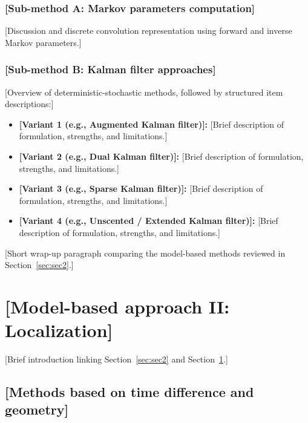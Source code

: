 \documentclass[final,5p,times,twocolumn]{elsarticle}
\begin{document}
\subsubsection{[Sub-method A: Markov parameters computation]}\label{subsubsec:sec2_2_1}

[Discussion and discrete convolution representation using forward and inverse Markov parameters.]

\subsubsection{[Sub-method B: Kalman filter approaches]}\label{subsubsec:sec2_2_2}

[Overview of deterministic-stochastic methods, followed by structured item descriptions:]
\begin{itemize}
    \item \textbf{[Variant 1 (e.g., Augmented Kalman filter)]:} [Brief description of formulation, strengths, and limitations.]
    \item \textbf{[Variant 2 (e.g., Dual Kalman filter)]:} [Brief description of formulation, strengths, and limitations.]
    \item \textbf{[Variant 3 (e.g., Sparse Kalman filter)]:} [Brief description of formulation, strengths, and limitations.]
    \item \textbf{[Variant 4 (e.g., Unscented / Extended Kalman filter)]:} [Brief description of formulation, strengths, and limitations.]
\end{itemize}

[Short wrap-up paragraph comparing the model-based methods reviewed in Section~\ref{sec:sec2}.]

\section{[Model-based approach II: Localization]}\label{sec:sec3}

[Brief introduction linking Section~\ref{sec:sec2} and Section~\ref{sec:sec3}.]

\subsection{[Methods based on time difference and geometry]}\label{subsec:sec3_1}
\end{document}
